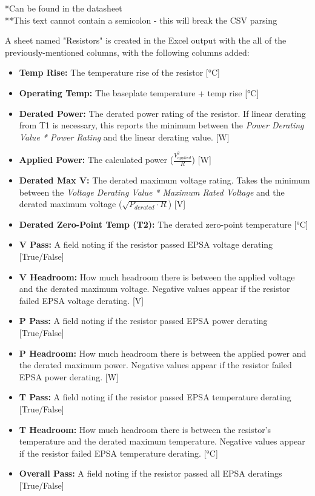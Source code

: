 \documentclass[12pt]{article}
\begin{document}
{\footnotesize
*Can be found in the datasheet\\
**This text cannot contain a semicolon - this will break the CSV parsing
}

A sheet named "Resistors" is created in the Excel output with the all of the previously-mentioned columns, with the following columns added:

\begin{itemize}
    \item \textbf{Temp Rise:} The temperature rise of the resistor [°C]
    \item \textbf{Operating Temp:} The baseplate temperature + temp rise [°C]
    \item \textbf{Derated Power:} The derated power rating of the resistor. If linear derating from T1 is necessary, this reports the minimum between the \textit{Power Derating Value * Power Rating} and the linear derating value. [W]
    \item \textbf{Applied Power:} The calculated power (\(\frac{V_{applied}^2}{R}\)) [W]
    \item \textbf{Derated Max V:} The derated maximum voltage rating. Takes the minimum between the \textit{Voltage Derating Value * Maximum Rated Voltage} and the derated maximum voltage (\(\sqrt{P_{derated} ⋅ R}\)) [V]
    \item \textbf{Derated Zero-Point Temp (T2):} The derated zero-point temperature [°C]
    \item \textbf{V Pass:} A field noting if the resistor passed EPSA voltage derating [True/False]
    \item \textbf{V Headroom:} How much headroom there is between the applied voltage and the derated maximum voltage. Negative values appear if the resistor failed EPSA voltage derating. [V]
    \item \textbf{P Pass:} A field noting if the resistor passed EPSA power derating [True/False]
    \item \textbf{P Headroom:} How much headroom there is between the applied power and the derated maximum power. Negative values appear if the resistor failed EPSA power derating. [W]
    \item \textbf{T Pass:} A field noting if the resistor passed EPSA temperature derating [True/False]
    \item \textbf{T Headroom:} How much headroom there is between the resistor's temperature and the derated maximum temperature. Negative values appear if the resistor failed EPSA temperature derating. [°C]
    \item \textbf{Overall Pass:} A field noting if the resistor passed all EPSA deratings [True/False]
\end{itemize}
\end{document}
